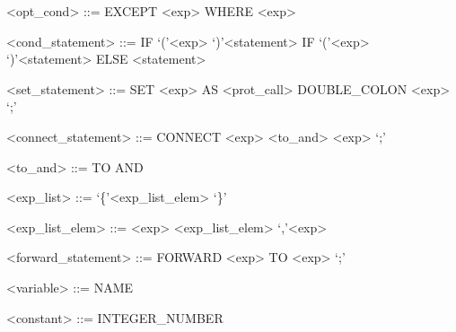 \begin{grammar}
<opt\_cond> ::= EXCEPT <exp> \alt WHERE <exp>

<cond\_statement> ::= IF \lq(\rq <exp> \lq)\rq <statement> \alt IF \lq(\rq <exp> \lq)\rq <statement> ELSE <statement>

<set\_statement> ::= SET <exp> AS <prot\_call> DOUBLE\_COLON <exp> \lq;\rq

<connect\_statement> ::= CONNECT <exp> <to\_and> <exp> \lq;\rq

<to\_and> ::= TO \alt AND

<exp\_list> ::= \lq\{\rq <exp\_list\_elem> \lq\}\rq

<exp\_list\_elem> ::= <exp> \alt <exp\_list\_elem> \lq,\rq <exp>

<forward\_statement> ::= FORWARD <exp> TO <exp> \lq;\rq

<variable> ::= NAME

<constant> ::= INTEGER\_NUMBER

\end{grammar}
